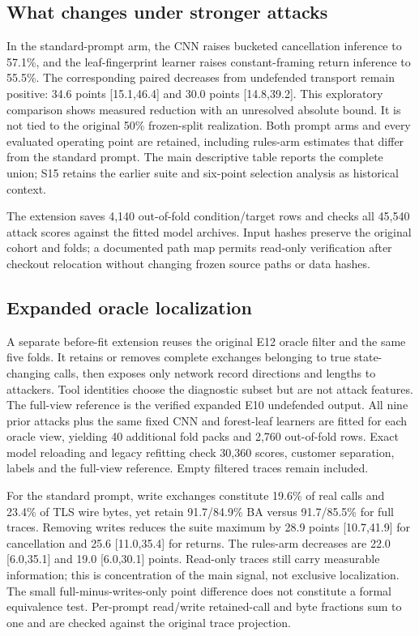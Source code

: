 

\subsection{What changes under stronger attacks}
In the standard-prompt arm, the CNN raises bucketed cancellation inference to 57.1\%, and the leaf-fingerprint learner raises constant-framing return inference to 55.5\%. The corresponding paired decreases from undefended transport remain positive: 34.6 points [15.1,46.4] and 30.0 points [14.8,39.2]. This exploratory comparison shows measured reduction with an unresolved absolute bound. It is not tied to the original 50\% frozen-split realization. Both prompt arms and every evaluated operating point are retained, including rules-arm estimates that differ from the standard prompt. The main descriptive table reports the complete union; S15 retains the earlier suite and six-point selection analysis as historical context.

The extension saves 4,140 out-of-fold condition/target rows and checks all 45,540 attack scores against the fitted model archives. Input hashes preserve the original cohort and folds; a documented path map permits read-only verification after checkout relocation without changing frozen source paths or data hashes.

\subsection{Expanded oracle localization}
A separate before-fit extension reuses the original E12 oracle filter and the same five folds. It retains or removes complete exchanges belonging to true state-changing calls, then exposes only network record directions and lengths to attackers. Tool identities choose the diagnostic subset but are not attack features. The full-view reference is the verified expanded E10 undefended output. All nine prior attacks plus the same fixed CNN and forest-leaf learners are fitted for each oracle view, yielding 40 additional fold packs and 2,760 out-of-fold rows. Exact model reloading and legacy refitting check 30,360 scores, customer separation, labels and the full-view reference. Empty filtered traces remain included.



For the standard prompt, write exchanges constitute 19.6\% of real calls and 23.4\% of TLS wire bytes, yet retain 91.7/84.9\% BA versus 91.7/85.5\% for full traces. Removing writes reduces the suite maximum by 28.9 points [10.7,41.9] for cancellation and 25.6 [11.0,35.4] for returns. The rules-arm decreases are 22.0 [6.0,35.1] and 19.0 [6.0,30.1] points. Read-only traces still carry measurable information; this is concentration of the main signal, not exclusive localization. The small full-minus-writes-only point difference does not constitute a formal equivalence test. Per-prompt read/write retained-call and byte fractions sum to one and are checked against the original trace projection.
